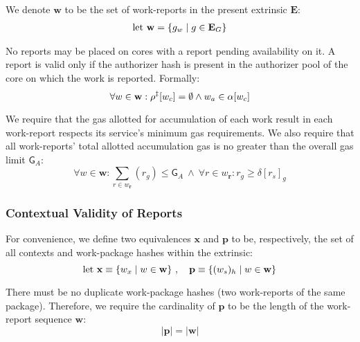 We denote $\mathbf{w}$ to be the set of work-reports in the present extrinsic $\mathbf{E}$:
\begin{align}\label{eq:incomingworkreports}
  \text{let}\ \mathbf{w} = \{ g_w \mid g \in \mathbf{E}_G \}
\end{align}

No reports may be placed on cores with a report pending availability on it. A report is valid only if the authorizer hash is present in the authorizer pool of the core on which the work is reported. Formally:
\begin{equation}\label{eq:reportcoresareunusedortimedout}
  \forall w \in \mathbf{w} :
    \rho^\ddagger[w_c] = \emptyset \wedge w_a \in \alpha[w_c]
\end{equation}

We require that the gas allotted for accumulation of each work result in each work-report respects its service's minimum gas requirements. We also require that all work-reports' total allotted accumulation gas is no greater than the overall gas limit $\mathsf{G}_A$:
\begin{equation}
  \forall w \in \mathbf{w}:
    \sum_{r \in w_\mathbf{r}}\!(r_g) \le \mathsf{G}_A \ \wedge \ 
    \forall r \in w_\mathbf{r}: r_g \ge \delta[r_s]_g
\end{equation}












\subsubsection{Contextual Validity of Reports}\label{sec:contextualvalidity}

For convenience, we define two equivalences $\mathbf{x}$ and $\mathbf{p}$ to be, respectively, the set of all contexts and work-package hashes within the extrinsic:
\begin{equation}
    \text{let } \mathbf{x} \equiv \{ w_x \mid w \in \mathbf{w} \}\ ,\quad
    \mathbf{p} \equiv \{ (w_s)_h \mid w \in \mathbf{w} \}
\end{equation}

There must be no duplicate work-package hashes (\ie two work-reports of the same package). Therefore, we require the cardinality of $\mathbf{p}$ to be the length of the work-report sequence $\mathbf{w}$:
\begin{equation}
  |\mathbf{p}| = |\mathbf{w}|
\end{equation}


